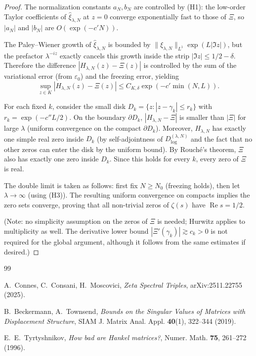 \documentclass[11pt,a4paper]{article}
\begin{document}
\begin{proof}
The normalization constants \(a_N,b_N\) are controlled by (H1): the low-order Taylor coefficients of \(\widehat{\xi}_{\lambda,N}\) at \(z=0\) converge exponentially fast to those of \(\Xi\), so \(|a_N|\) and \(|b_N|\) are \(O(\exp(-c'N))\).

The Paley--Wiener growth of \(\widehat{\xi}_{\lambda,N}\) is bounded by \(\|\xi_{\lambda,N}\|_{L^1}\exp(L|\Im z|)\), but the prefactor \(\lambda^{-iz}\) exactly cancels this growth inside the strip \(|\Im z|\leq1/2-\delta\). Therefore the difference \(|H_{\lambda,N}(z)-\Xi(z)|\) is controlled by the sum of the variational error (from \(\varepsilon_0\)) and the freezing error, yielding
\[
\sup_{z\in K}|H_{\lambda,N}(z)-\Xi(z)|\leq C_{K,\delta}\exp(-c'\min(N,L)).
\]

For each fixed \(k\), consider the small disk \(D_k = \{z:|z-\gamma_k|\leq r_k\}\) with \(r_k=\exp(-c''L/2)\). On the boundary \(\partial D_k\), \(|H_{\lambda,N}-\Xi|\) is smaller than \(|\Xi|\) for large \(\lambda\) (uniform convergence on the compact \(\partial D_k\)). Moreover, \(H_{\lambda,N}\) has exactly one simple real zero inside \(D_k\) (by self-adjointness of \(D_{\log}^{(\lambda,N)}\) and the fact that no other zeros can enter the disk by the uniform bound). By Rouch\'{e}'s theorem, \(\Xi\) also has exactly one zero inside \(D_k\). Since this holds for every \(k\), every zero of \(\Xi\) is real.

The double limit is taken as follows: first fix \(N\geq N_0\) (freezing holds), then let \(\lambda\to\infty\) (using (H3)). The resulting uniform convergence on compacts implies the zero sets converge, proving that all non-trivial zeros of \(\zeta(s)\) have \(\operatorname{Re}s = 1/2\).

(Note: no simplicity assumption on the zeros of \(\Xi\) is needed; Hurwitz applies to multiplicity as well. The derivative lower bound \(|\Xi'(\gamma_k)|\gtrsim c_k>0\) is not required for the global argument, although it follows from the same estimates if desired.)
\end{proof}


\begin{thebibliography}{99}

A.~Connes, C.~Consani, H.~Moscovici, \emph{Zeta Spectral Triples}, arXiv:2511.22755 (2025).

B.~Beckermann, A.~Townsend, \emph{Bounds on the Singular Values of Matrices with Displacement Structure}, SIAM J. Matrix Anal. Appl. \textbf{40}(1), 322--344 (2019).

E.~E.~Tyrtyshnikov, \emph{How bad are Hankel matrices?}, Numer. Math. \textbf{75}, 261--272 (1996).

\end{thebibliography}
\end{document}
